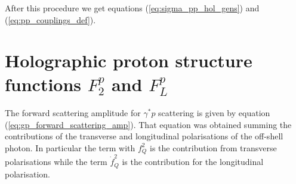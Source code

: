\documentclass[a4paper,12pt]{article}
\begin{document}
After this procedure we get equations (\ref{eq:sigma_pp_hol_gens}) and (\ref{eq:pp_couplings_def}).

\section{Holographic proton structure functions $F^p_2$ and $F^p_L$}

The forward scattering amplitude for $\gamma^{*}p$ scattering is given by equation (\ref{eq:gp_forward_scattering_amp}). That equation was obtained summing the contributions of the transverse and longitudinal polarisations of the off-shell photon. In particular the term with $f_Q^2$ is the contribution from transverse polarisations while the term $\dot{f}_Q^2$ is the contribution for the longitudinal polarisation.
\end{document}
